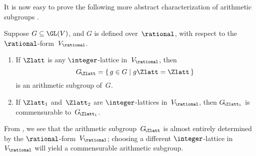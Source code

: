 It is now easy to prove the following more abstract
characterization of arithmetic subgroups .

\begin{prop} \label{AbstractArith}
 Suppose $G \subseteq \GL(V)$, and $G$ is defined
over\/~$\rational$, with respect to the\/
$\rational$-form~$V_{\rational}$.
 \begin{enumerate}
 \item \label{AbstractArith-arith}
 If $\Zlatt$ is any $\integer$-lattice in~$V_{\rational}$,
then
 $$ G\!_{\Zlatt} = \{\, g \in G \mid g \Zlatt = \Zlatt \,\}
$$
 is an arithmetic subgroup of~$G$.
 \item \label{AbstractArith-comm}
 If $\Zlatt_1$ and~$\Zlatt_2$ are
$\integer$-lattices in~$V_{\rational}$, then
$G\!_{\Zlatt_1}$ is commensurable to~$G\!_{\Zlatt_1}$.
 \end{enumerate}
 \end{prop}

From , we see that the
arithmetic subgroup~$G\!_{\Zlatt}$ is almost entirely determined
by the $\rational$-form~$V_{\rational}$; choosing a different $\integer$-lattice 
in $V_\rational$ will yield a commensurable arithmetic subgroup.


